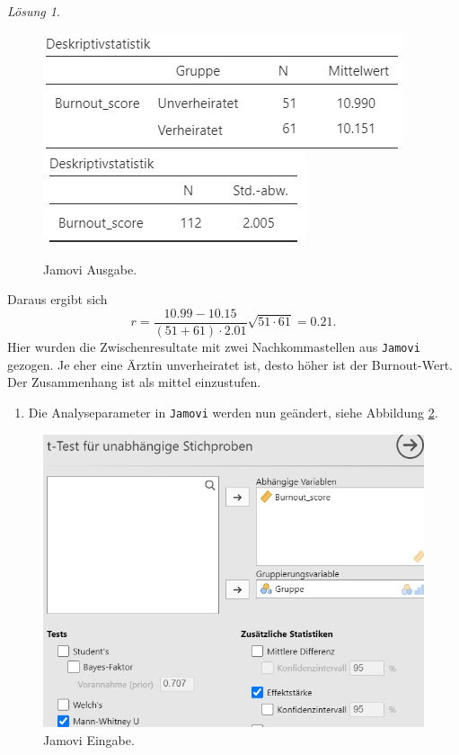 \documentclass[
]{book}
\providecommand{\tightlist}{%
  \setlength{\itemsep}{0pt}\setlength{\parskip}{0pt}}
\theoremstyle{definition}
\theoremstyle{definition}
\theoremstyle{definition}
\theoremstyle{definition}
\theoremstyle{remark}
\newtheorem*{solution}{Lösung}
\begin{document}
\begin{solution}
\begin{figure}
\includegraphics[height=0.5\textheight]{figures/08-exr-ehe-burnout-pointcorrelation-jmv-output1} \includegraphics[height=0.5\textheight]{figures/08-exr-ehe-burnout-pointcorrelation-jmv-output2} \caption{Jamovi Ausgabe.}\label{fig:sol-ehe-burnout-pointcorrelation-output}
\end{figure}

Daraus ergibt sich
\[ r = \frac{10.99- 10.15}{(51+61)\cdot 2.01}\sqrt{51\cdot 61} = 0.21.\]
Hier wurden die Zwischenresultate mit zwei Nachkommastellen aus \texttt{Jamovi} gezogen. Je eher eine Ärztin unverheiratet ist, desto höher ist der Burnout-Wert. Der Zusammenhang ist als mittel einzustufen.

\begin{enumerate}
\def\labelenumi{\alph{enumi})}
\setcounter{enumi}{1}
\tightlist
\item
  Die Analyseparameter in \texttt{Jamovi} werden nun geändert, siehe Abbildung \ref{fig:sol-ehe-burnout-rankcorrelation-input}.
\end{enumerate}

\begin{figure}
\centering
\includegraphics{figures/08-exr-ehe-burnout-pointcorrelation-jmv-input3.jpg}
\caption{\label{fig:sol-ehe-burnout-rankcorrelation-input}Jamovi Eingabe.}
\end{figure}


\end{solution}
\end{document}
